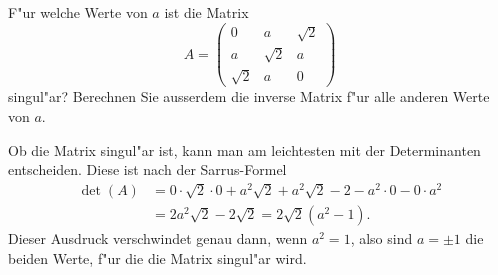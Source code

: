F"ur welche Werte von $a$ ist die Matrix 
\[
A=\begin{pmatrix}
0&a&\sqrt{2}\\
a&\sqrt{2}&a\\
\sqrt{2}&a&0
\end{pmatrix}
\]
singul"ar?
Berechnen Sie ausserdem die inverse Matrix f"ur alle anderen Werte von $a$.

\begin{loesung}
Ob die Matrix singul"ar ist, kann man am leichtesten mit der Determinanten
entscheiden. 
Diese ist nach der Sarrus-Formel
\begin{align*}
\det(A)
&=
0\cdot \sqrt{2}\cdot 0+a^2\sqrt{2}+a^2\sqrt{2}-2-a^2\cdot 0 - 0\cdot a^2
\\
&=2a^2\sqrt{2}-2\sqrt{2}=2\sqrt{2}(a^2-1).
\end{align*}
Dieser Ausdruck verschwindet genau dann, wenn $a^2=1$,
also sind $a=\pm1$ die beiden Werte, f"ur die die Matrix singul"ar wird.


\end{loesung}
